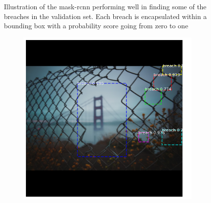 \documentclass[../Head/Main.tex]{subfiles}
\begin{document}
\begin{figure}[H]
\begin{subfigure}{.24\textwidth}
        \caption{}
    \end{subfigure}
    \caption{Illustration of the mask-rcnn performing well in finding some of the breaches in the validation set. Each breach is encapsulated within a bounding box with a probability score going from zero to one}
     \label{fig:rcnn_good_performance}
\end{figure}

\begin{figure}[H]
    \centering
    \begin{subfigure}{.23\textwidth}
        \centering
        \includegraphics[width=\textwidth]{../Figures/rcnn_results/found_breaches/bad_performance/10.png}
        \caption{}
        \label{fig:rcnn_bad_performance1}
    \end{subfigure}
    \hfill
    \begin{subfigure}{.23\textwidth}
        \centering

\end{subfigure}
\end{figure}
\end{document}
